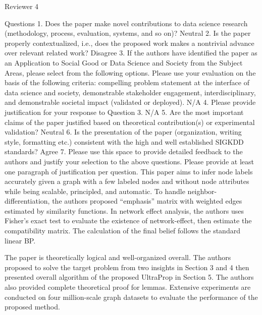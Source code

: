 



Reviewer 4

Questions
1. Does the paper make novel contributions to data science research (methodology, process, evaluation, systems, and so on)?
Neutral
2. Is the paper properly contextualized, i.e., does the proposed work makes a nontrivial advance over relevant related work?
Disagree
3. If the authors have identified the paper as an Application to Social Good or Data Science and Society from the Subject Areas, please select from the following options. Please use your evaluation on the basis of the following criteria: compelling problem statement at the interface of data science and society, demonstrable stakeholder engagement, interdisciplinary, and demonstrable societal impact (validated or deployed).
N/A
4. Please provide justification for your response to Question 3.
N/A
5. Are the most important claims of the paper justified based on theoretical contribution(s) or experimental validation?
Neutral
6. Is the presentation of the paper (organization, writing style, formatting etc.) consistent with the high and well established SIGKDD standards?
Agree
7. Please use this space to provide detailed feedback to the authors and justify your selection to the above questions. Please provide at least one paragraph of justification per question.
This paper aims to infer node labels accurately given a graph with a few labeled nodes and without node attributes while being scalable, principled, and automatic. To handle neighbor-differentiation, the authors proposed “emphasis” matrix with weighted edges estimated by similarity functions. In network effect analysis, the authors uses Fisher’s exact test to evaluate the existence of network-effect, then estimate the compatibility matrix. The calculation of the final belief follows the standard linear BP.

The paper is theoretically logical and well-organized overall. The authors proposed to solve the target problem from two insights in Section 3 and 4 then presented overall algorithm of the proposed UltraProp in Section 5. The authors also provided complete theoretical proof for lemmas. Extensive experiments are conducted on four million-scale graph datasets to evaluate the performance of the proposed method.

